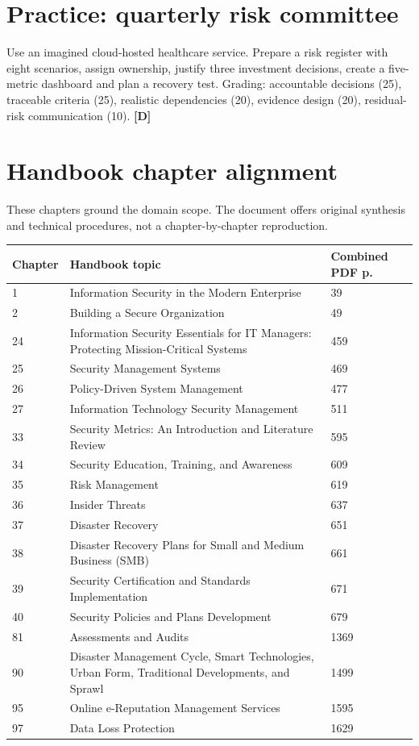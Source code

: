 \documentclass[10pt,letterpaper,oneside]{article}
\newcommand{\designed}{\textsf{\color{accent}\textbf{[D]}}}
\begin{document}
\section{Practice: quarterly risk committee}
Use an imagined cloud-hosted healthcare service. Prepare a risk register with eight scenarios, assign ownership, justify three investment decisions, create a five-metric dashboard and plan a recovery test. Grading: accountable decisions (25), traceable criteria (25), realistic dependencies (20), evidence design (20), residual-risk communication (10). \designed{}

\section*{Handbook chapter alignment}
These chapters ground the domain scope. The document offers original synthesis and technical procedures, not a chapter-by-chapter reproduction.
\par\medskip\noindent\begin{longtable}{@{}p{}p{}p{}@{}}\toprule Chapter & Handbook topic & Combined PDF p. \\ \midrule\endhead1 & Information Security in the Modern Enterprise & 39 \\
2 & Building a Secure Organization & 49 \\
24 & Information Security Essentials for IT Managers: Protecting Mission-Critical Systems & 459 \\
25 & Security Management Systems & 469 \\
26 & Policy-Driven System Management & 477 \\
27 & Information Technology Security Management & 511 \\
33 & Security Metrics: An Introduction and Literature Review & 595 \\
34 & Security Education, Training, and Awareness & 609 \\
35 & Risk Management & 619 \\
36 & Insider Threats & 637 \\
37 & Disaster Recovery & 651 \\
38 & Disaster Recovery Plans for Small and Medium Business (SMB) & 661 \\
39 & Security Certification and Standards Implementation & 671 \\
40 & Security Policies and Plans Development & 679 \\
81 & Assessments and Audits & 1369 \\
90 & Disaster Management Cycle, Smart Technologies, Urban Form, Traditional Developments, and Sprawl & 1499 \\
95 & Online e-Reputation Management Services & 1595 \\
97 & Data Loss Protection & 1629 \\
\bottomrule\end{longtable}\par\medskip
\end{document}
